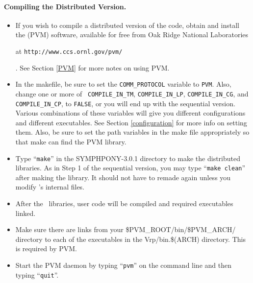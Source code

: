 \paragraph{Compiling the Distributed Version.}

\begin{itemize}
        \item If you wish to compile a distributed version of the code, obtain
and install the {\em {}} (PVM) software, available for free
from Oak Ridge National Laboratories
\begin{latexonly}
        at {\tt http://www.ccs.ornl.gov/pvm/}
\end{latexonly}. 
        See Section \ref{PVM} for more notes on using PVM.
        
        \item In the makefile, be sure to set the {\tt COMM\_PROTOCOL}
        variable to {\tt PVM}. Also, change one or more of {\tt
        COMPILE\_IN\_TM}, {\tt COMPILE\_IN\_LP}, {\tt COMPILE\_IN\_CG}, and
        {\tt COMPILE\_IN\_CP}, to {\tt FALSE}, or you will end up with the
        sequential version. Various combinations of these variables will give
        you different configurations and different executables. See Section
        \ref{configuration} for more info on setting them. Also, be sure to
        set the path variables in the make file appropriately so that make can
        find the PVM library.

        \item Type ``{\tt make}'' in the SYMPHPONY-3.0.1 directory to
        make the distributed libraries. As in Step 1 of the sequential
        version, you may type ``{\tt make clean}'' after making the
        library. It should not have to remade again unless you modify
        \BB's internal files.

        \item After the \BB\ libraries, user code will be compiled and
        required executables linked.

        \item Make sure there are links from your
        \$PVM\_ROOT/bin/\$PVM\_ARCH/ directory to each of the
        executables in the Vrp/bin.\$(ARCH) directory. This is required
        by PVM.

        \item Start the PVM daemon by typing ``{\tt pvm}'' on the command line
        and then typing ``{\tt quit}''.


\end{itemize}
